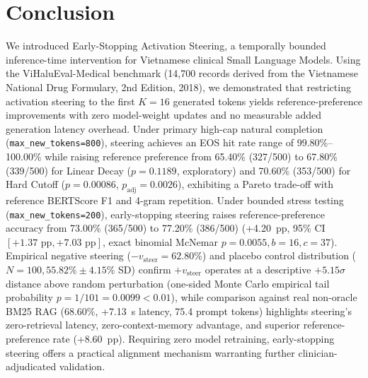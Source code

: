 \documentclass[conference]{IEEEtran}
\begin{document}
\section{Conclusion}
We introduced Early-Stopping Activation Steering, a temporally bounded inference-time intervention for Vietnamese clinical Small Language Models. Using the ViHaluEval-Medical benchmark (14,700 records derived from the Vietnamese National Drug Formulary, 2nd Edition, 2018), we demonstrated that restricting activation steering to the first $K=16$ generated tokens yields reference-preference improvements with zero model-weight updates and no measurable added generation latency overhead. Under primary high-cap natural completion (\texttt{max\_new\_tokens=800}), steering achieves an EOS hit rate range of 99.80\%--100.00\% while raising reference preference from 65.40\% (327/500) to 67.80\% (339/500) for Linear Decay ($p=0.1189$, exploratory) and 70.60\% (353/500) for Hard Cutoff ($p=0.00086$, $p_{\text{adj}}=0.0026$), exhibiting a Pareto trade-off with reference BERTScore F1 and 4-gram repetition. Under bounded stress testing (\texttt{max\_new\_tokens=200}), early-stopping steering raises reference-preference accuracy from 73.00\% (365/500) to 77.20\% (386/500) (+4.20~pp, 95\% CI $[+1.37\text{ pp}, +7.03\text{ pp}]$, exact binomial McNemar $p=0.0055, b=16, c=37$). Empirical negative steering ($-v_{\text{steer}}=62.80\%$) and placebo control distribution ($N=100, 55.82\%\pm4.15\%$ SD) confirm $+v_{\text{steer}}$ operates at a descriptive $+5.15\sigma$ distance above random perturbation (one-sided Monte Carlo empirical tail probability $p=1/101=0.0099 < 0.01$), while comparison against real non-oracle BM25 RAG (68.60\%, +7.13~s latency, 75.4 prompt tokens) highlights steering's zero-retrieval latency, zero-context-memory advantage, and superior reference-preference rate (+8.60~pp). Requiring zero model retraining, early-stopping steering offers a practical alignment mechanism warranting further clinician-adjudicated validation.
\end{document}
